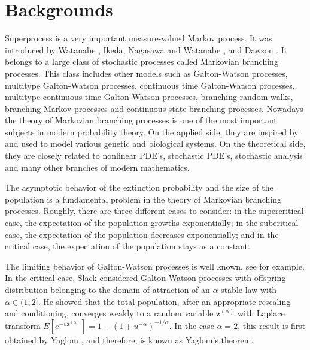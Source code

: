 \documentclass[UTF8]{pkuthss}
\theoremstyle{plain}
\theoremstyle{definition}
\numberwithin{equation}{section}
\begin{document}
\section{Backgrounds}
    Superprocess is a very important measure-valued Markov process. 
    It was introduced by Watanabe \cite{Watanabe1968A-limit}, Ikeda, Nagasawa and Watanabe \cite{IkedaNagasawaWatanabe1968Branching1,IkedaNagasawaWatanabe1968Branching2,IkedaNagasawaWatanabe1968Branching3}, and Dawson \cite{Dawson1975Stochastic,Dawson1977The-critical}. 
    It belongs to a large class of stochastic processes called Markovian branching processes. 
    This class includes other models such as Galton-Watson processes, multitype Galton-Watson processes, continuous time Galton-Watson processes, multitype continuous time Galton-Watson processes, branching random walks, branching Markov processes and continuous state branching processes.
    Nowadays the theory of Markovian branching processes is one of the most important subjects in modern probability theory.
    On the applied side, they are inspired by and used to model various genetic and biological systems. 
    On the theoretical side, they are closely related to nonlinear PDE's, stochastic PDE's, stochastic analysis and many other branches of modern mathematics.

    The asymptotic behavior of the extinction probability and the size of the population is a fundamental problem in the theory of Markovian branching processes. 
    Roughly, there are three different cases to consider: in the supercritical case, the expectation of the population growths exponentially; in the subcritical case, the expectation of the population decreases exponentially; and in the critical case, the expectation of the population stays as a constant. 

    The limiting behavior of Galton-Watson processes is well known, see \cite{AthreyaNey1972Branching} for example. 
    In the critical case, Slack \cite{Slack1968A-branching} considered Galton-Watson processes with offspring distribution belonging to the domain of attraction of an $\alpha$-stable law with $\alpha \in (1,2]$. 
    He showed that the total population, after an appropriate rescaling and conditioning, converges weakly to a random variable $\mathbf z^{(\alpha)}$ with Laplace transform $E[e^{-u\mathbf z^{(\alpha)}}] = 1-(1+u^{-\alpha})^{-1/\alpha}$. 
    In the case $\alpha = 2$, this result is first obtained by Yaglom \cite{Yaglom1947Certain}, and therefore, is known as Yaglom's theorem.
    
\end{document}
